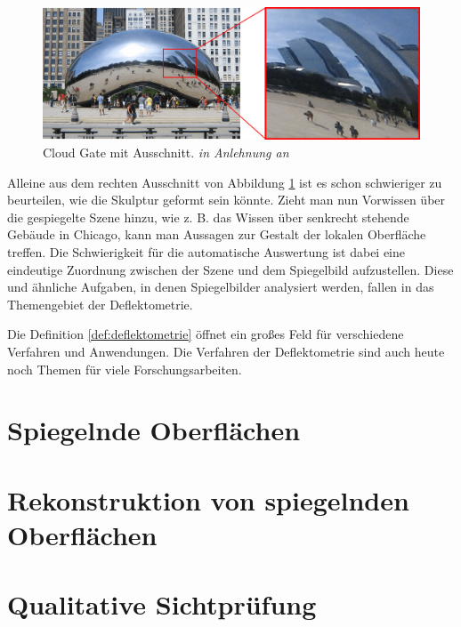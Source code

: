 \begin{figure}[H]
	\centering
	\includegraphics[width=\textwidth]{02_grundlagenZurDeflektometrie/figures/cloudGateMitAusschnitt}
	\caption[Cloud Gate mit Ausschnitt]{Cloud Gate mit Ausschnitt. \textit{in Anlehnung an} \cite{cloudGateChicago}}
	\label{img:cloudGateMitAusschnitt}
\end{figure}

\noindent
Alleine aus dem rechten Ausschnitt von Abbildung \ref{img:cloudGateMitAusschnitt} ist es schon schwieriger zu beurteilen, wie die Skulptur geformt sein könnte.
Zieht man nun Vorwissen über die gespiegelte Szene hinzu, wie z. B. das Wissen über senkrecht stehende Gebäude in Chicago, kann man Aussagen zur Gestalt der lokalen Oberfläche treffen.
Die Schwierigkeit für die automatische Auswertung ist dabei eine eindeutige Zuordnung zwischen der Szene und dem Spiegelbild aufzustellen.
Diese und ähnliche Aufgaben, in denen Spiegelbilder analysiert werden, fallen in das Themengebiet der Deflektometrie.

\p
Die Definition \ref{def:deflektometrie} öffnet ein großes Feld für verschiedene Verfahren und Anwendungen.
Die Verfahren der Deflektometrie sind auch heute noch Themen für viele Forschungsarbeiten.

{
	\FloatBarrier
    \section{Spiegelnde Oberflächen}
    \label{sec:spiegelndeOberflaechen}
    
}

{
	\FloatBarrier
    \section{Rekonstruktion von spiegelnden Oberflächen}
    \label{sec:rekonstruktion}
    
}

{
	\FloatBarrier
    \section{Qualitative Sichtprüfung}
    \label{sec:qualitativeSichtpruefung}
    
}